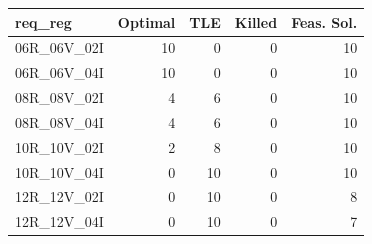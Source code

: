 
\begin{tabular}{lrrrr}
\toprule
req\_reg & Optimal & TLE & Killed & Feas. Sol.\\
\midrule
06R\_06V\_02I & 10 & 0 & 0 & 10\\
06R\_06V\_04I & 10 & 0 & 0 & 10\\
08R\_08V\_02I & 4 & 6 & 0 & 10\\
08R\_08V\_04I & 4 & 6 & 0 & 10\\
10R\_10V\_02I & 2 & 8 & 0 & 10\\
\addlinespace
10R\_10V\_04I & 0 & 10 & 0 & 10\\
12R\_12V\_02I & 0 & 10 & 0 & 8\\
12R\_12V\_04I & 0 & 10 & 0 & 7\\
\bottomrule
\end{tabular}
